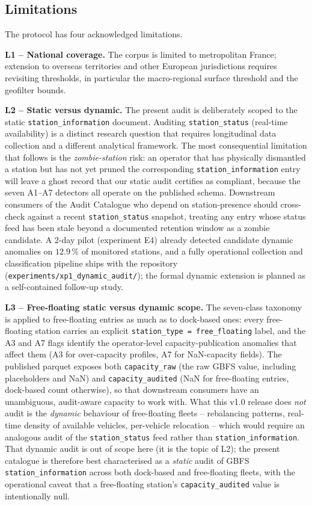\documentclass[11pt,a4paper]{article}
\begin{document}
\subsection{Limitations}\label{secLimitations}
The protocol has four acknowledged limitations.

\textbf{L1 -- National coverage.} The corpus is limited to metropolitan
France; extension to overseas territories and other European
jurisdictions requires revisiting thresholds, in particular the
macro-regional surface threshold and the geofilter bounds.

\textbf{L2 -- Static versus dynamic.} The present audit is
deliberately scoped to the static \texttt{station\_information}
document. Auditing \texttt{station\_status} (real-time availability)
is a distinct research question that requires longitudinal data
collection and a different analytical framework. The most
consequential limitation that follows is the \emph{zombie-station}
risk: an operator that has physically dismantled a station but has
not yet pruned the corresponding \texttt{station\_information} entry
will leave a ghost record that our static audit certifies as
compliant, because the seven A1--A7 detectors all operate on the
published schema. Downstream consumers of the Audit Catalogue who
depend on station-presence should cross-check against a recent
\texttt{station\_status} snapshot, treating any entry whose status
feed has been stale beyond a documented retention window as a zombie
candidate. A 2-day pilot (experiment E4) already detected candidate
dynamic anomalies on $12.9\,\%$ of monitored stations, and a
fully operational collection and classification pipeline ships with
the repository (\texttt{experiments/xp1\_dynamic\_audit/}); the
formal dynamic extension is planned as a self-contained follow-up
study.

\textbf{L3 -- Free-floating static versus dynamic scope.}
The seven-class taxonomy is applied to free-floating entries as
much as to dock-based ones: every free-floating station carries
an explicit \texttt{station\_type = free\_floating} label, and the
A3 and A7 flags identify the operator-level capacity-publication
anomalies that affect them (A3 for over-capacity profiles, A7 for
NaN-capacity fields). The published parquet exposes both
\texttt{capacity\_raw} (the raw GBFS value, including placeholders
and NaN) and \texttt{capacity\_audited} (NaN for free-floating
entries, dock-based count otherwise), so that downstream consumers
have an unambiguous, audit-aware capacity to work with. What this
v1.0 release does \emph{not} audit is the \emph{dynamic} behaviour
of free-floating fleets -- rebalancing patterns, real-time density
of available vehicles, per-vehicle relocation -- which would
require an analogous audit of the \texttt{station\_status} feed
rather than \texttt{station\_information}. That dynamic audit is
out of scope here (it is the topic of L2); the present catalogue
is therefore best characterised as a \emph{static} audit of GBFS
\texttt{station\_information} across both dock-based and
free-floating fleets, with the operational caveat that a
free-floating station's \texttt{capacity\_audited} value is
intentionally null.
\end{document}
